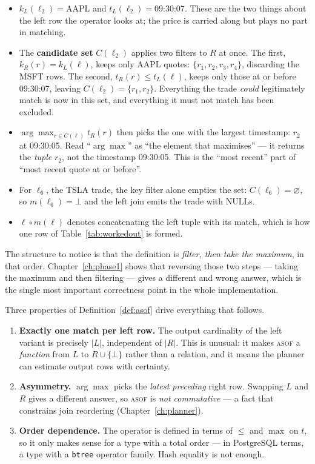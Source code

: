 \documentclass[11pt,a4paper]{report}
\theoremstyle{definition}
\theoremstyle{plain}
\newcommand{\code}[1]{\texttt{\small #1}}
\newcommand{\asof}{{\normalfont\scshape asof}}
\begin{document}
\begin{itemize}[leftmargin=*]
\item $k_L(\ell_2) = \text{AAPL}$ and $t_L(\ell_2) = \text{09:30:07}$. These are the two
      things about the left row the operator looks at; the price is carried along but plays
      no part in matching.
\item The \textbf{candidate set} $C(\ell_2)$ applies two filters to $R$ at once. The first,
      $k_R(r) = k_L(\ell)$, keeps only AAPL quotes: $\{r_1, r_2, r_3, r_4\}$, discarding the
      MSFT rows. The second, $t_R(r) \le t_L(\ell)$, keeps only those at or before 09:30:07,
      leaving $C(\ell_2) = \{r_1, r_2\}$. Everything the trade \emph{could} legitimately
      match is now in this set, and everything it must not match has been excluded.
\item $\arg\max_{r \in C(\ell)} t_R(r)$ then picks the one with the largest timestamp:
      $r_2$ at 09:30:05. Read ``$\arg\max$'' as ``the element that maximises'' --- it returns
      the \emph{tuple} $r_2$, not the timestamp 09:30:05. This is the ``most recent'' part of
      ``most recent quote at or before''.
\item For $\ell_6$, the TSLA trade, the key filter alone empties the set:
      $C(\ell_6) = \varnothing$, so $m(\ell_6) = \bot$ and the left join emits the trade with
      NULLs.
\item $\ell \circ m(\ell)$ denotes concatenating the left tuple with its match, which is how
      one row of Table~\ref{tab:workedout} is formed.
\end{itemize}

The structure to notice is that the definition is \emph{filter, then take the maximum}, in
that order. Chapter~\ref{ch:phase1} shows that reversing those two steps --- taking the
maximum and then filtering --- gives a different and wrong answer, which is the single most
important correctness point in the whole implementation.

Three properties of Definition~\ref{def:asof} drive everything that follows.

\begin{enumerate}[label=(P\arabic*),leftmargin=*]
\item \textbf{Exactly one match per left row.} The output cardinality of the left variant is
      precisely $|L|$, independent of $|R|$. This is unusual: it makes \asof{} a
      \emph{function} from $L$ to $R \cup \{\bot\}$ rather than a relation, and it means
      the planner can estimate output rows with certainty.
\item \textbf{Asymmetry.} $\arg\max$ picks the \emph{latest preceding} right row. Swapping
      $L$ and $R$ gives a different answer, so \asof{} is \emph{not commutative} --- a fact
      that constrains join reordering (Chapter~\ref{ch:planner}).
\item \textbf{Order dependence.} The operator is defined in terms of $\le$ and $\max$ on
      $t$, so it only makes sense for a type with a total order --- in PostgreSQL terms, a
      type with a \code{btree} operator family. Hash equality is not enough.
\end{enumerate}
\end{document}
